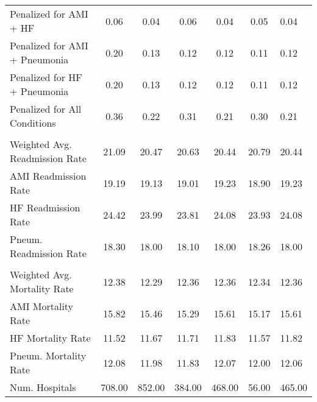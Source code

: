 \begin{table}[h]
\begin{tabular}[t]{lcccccl}
\hspace{1em}Penalized for AMI + HF & 0.06 & 0.04 & 0.06 & 0.04 & 0.05 & 0.04\\
\hspace{1em}Penalized for AMI + Pneumonia & 0.20 & 0.13 & 0.12 & 0.12 & 0.11 & 0.12\\
\hspace{1em}Penalized for HF + Pneumonia & 0.20 & 0.13 & 0.12 & 0.12 & 0.11 & 0.12\\
\hspace{1em}Penalized for All Conditions & 0.36 & 0.22 & 0.31 & 0.21 & 0.30 & 0.21\\
\addlinespace[0.3em]
\multicolumn{7}{l}{\textbf{Readmission Outcome Variables}}\\
\hspace{1em}Weighted Avg. Readmission Rate & 21.09 & 20.47 & 20.63 & 20.44 & 20.79 & 20.44\\
\hspace{1em}AMI Readmission Rate & 19.19 & 19.13 & 19.01 & 19.23 & 18.90 & 19.23\\
\hspace{1em}HF Readmission Rate & 24.42 & 23.99 & 23.81 & 24.08 & 23.93 & 24.08\\
\hspace{1em}Pneum. Readmission Rate & 18.30 & 18.00 & 18.10 & 18.00 & 18.26 & 18.00\\
\addlinespace[0.3em]
\multicolumn{7}{l}{\textbf{Mortality Outcome Variables}}\\
\hspace{1em}Weighted Avg. Mortality Rate & 12.38 & 12.29 & 12.36 & 12.36 & 12.34 & 12.36\\
\hspace{1em}AMI Mortality Rate & 15.82 & 15.46 & 15.29 & 15.61 & 15.17 & 15.61\\
\hspace{1em}HF Mortality Rate & 11.52 & 11.67 & 11.71 & 11.83 & 11.57 & 11.82\\
\hspace{1em}Pneum. Mortality Rate & 12.08 & 11.98 & 11.83 & 12.07 & 12.00 & 12.06\\
Num. Hospitals & 708.00 & 852.00 & 384.00 & 468.00 & 56.00 & 465.00\\
\bottomrule
\end{tabular}
\end{table}
